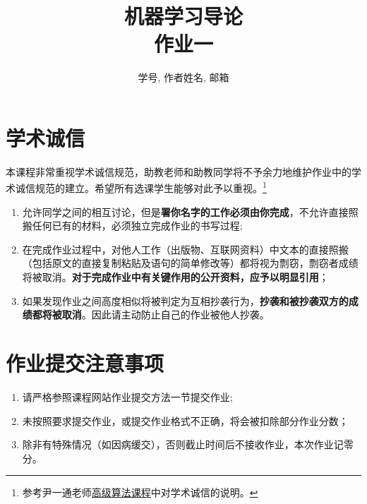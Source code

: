 \documentclass[a4paper,UTF8]{article}
\numberwithin{equation}{section}
\begin{document}
\title{机器学习导论\\
作业一}
\author{学号, 作者姓名, 邮箱}
\maketitle

\section*{学术诚信}

本课程非常重视学术诚信规范，助教老师和助教同学将不予余力地维护作业中的学术诚信规范的建立。希望所有选课学生能够对此予以重视。\footnote{参考尹一通老师\href{http://tcs.nju.edu.cn/wiki/index.php/\%E9\%9A\%8F\%E6\%9C/\%BA\%E7\%AE\%97\%E6\%B3\%95\_(Fall\_2015)}{高级算法课程}中对学术诚信的说明。}

\begin{tcolorbox}
\begin{enumerate}
  \item[(1)] 允许同学之间的相互讨论，但是{\color{red}\textbf{署你名字的工作必须由你完成}}，不允许直接照搬任何已有的材料，必须独立完成作业的书写过程;
  \item[(2)] 在完成作业过程中，对他人工作（出版物、互联网资料）中文本的直接照搬（包括原文的直接复制粘贴及语句的简单修改等）都将视为剽窃，剽窃者成绩将被取消。{\color{red}\textbf{对于完成作业中有关键作用的公开资料，应予以明显引用}}；
  \item[(3)] 如果发现作业之间高度相似将被判定为互相抄袭行为，{\color{red}\textbf{抄袭和被抄袭双方的成绩都将被取消}}。因此请主动防止自己的作业被他人抄袭。
\end{enumerate}
\end{tcolorbox}

\section*{作业提交注意事项}
\begin{tcolorbox}
\begin{enumerate}
  \item[(1)] 请严格参照课程网站作业提交方法一节提交作业;
  \item[(2)] 未按照要求提交作业，或提交作业格式不正确，将会被扣除部分作业分数；
  \item[(3)] 除非有特殊情况（如因病缓交），否则截止时间后不接收作业，本次作业记零分。
\end{enumerate}
\end{tcolorbox}

\newpage
\end{document}
